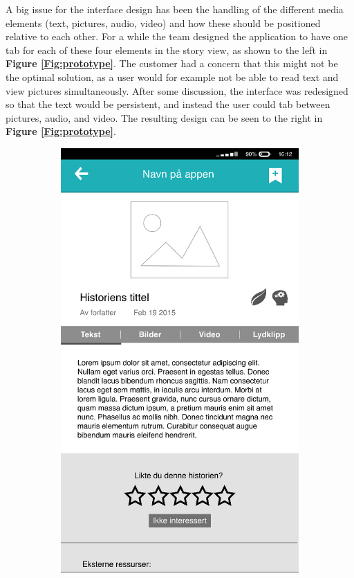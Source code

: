 A big issue for the interface design has been the handling of the different media elements (text, pictures, audio, video) and how these should be positioned relative to each other. For a while the team designed the application to have one tab for each of these four elements in the story view, as shown to the left in \textbf{Figure \ref{Fig:prototype}}. The customer had a concern that this might not be the optimal solution, as a user would for example not be able to read text and view pictures simultaneously. After some discussion, the interface was redesigned so that the text would be persistent, and instead the user could tab between pictures, audio, and video. The resulting design can be seen to the right in \textbf{Figure \ref{Fig:prototype}}. \newline

\begin{figure}
	\centering
	\begin{subfigure}[h]{0.3\textwidth}
		\includegraphics[width=\textwidth]{fig/prototype1}

\end{subfigure}
\end{figure}
